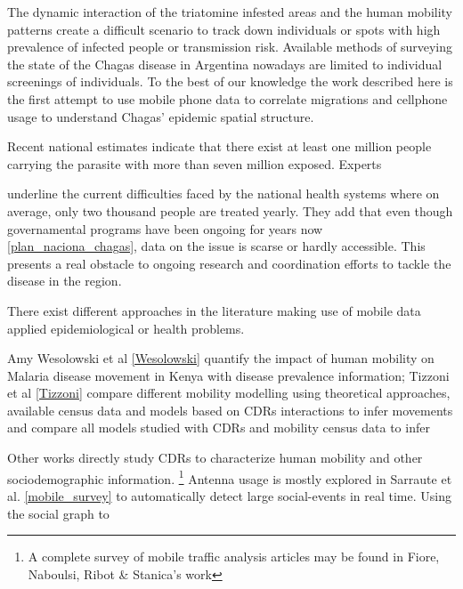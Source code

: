 The dynamic interaction of the triatomine infested areas and the human mobility patterns create a difficult scenario to track down individuals or spots with high prevalence of infected people or transmission risk. Available methods of surveying the state of the Chagas disease in Argentina nowadays are limited to individual screenings of individuals. To the best of our knowledge the work described here is the first attempt to use mobile phone data to correlate migrations and cellphone usage to understand Chagas’ epidemic spatial structure.

Recent national estimates indicate that there exist at least one million people carrying the parasite with more than seven million exposed. Experts \begin{comment}  aca como referencio a Diego Weinberg y Mundo Sano? \end{comment} underline the current difficulties faced by the national health systems where on average, only two thousand people are treated yearly. They add that even though governamental programs have been ongoing for years now \ref{plan_naciona_chagas}, data on the issue is scarse or hardly accessible. This presents a real obstacle to ongoing research and coordination efforts to tackle the disease in the region.

There exist different approaches in the literature making use of mobile data applied epidemiological or health problems.\begin{comment} La siguiente info la saco de aqui  https://docs.google.com/document/d/1ZClgYFTLCxmg7wvRXqz2V1EP7Wcg0vd2ZwEBOLW2VOk \end{comment} Amy Wesolowski et al \ref{Wesolowski}  quantify the impact of human mobility on Malaria disease movement in Kenya with disease prevalence information; Tizzoni et al \ref{Tizzoni} compare different mobility modelling using theoretical approaches, available census data and models based on CDRs interactions to infer movements and compare all models studied with CDRs and mobility census data to infer

Other works directly study CDRs to characterize human mobility and other sociodemographic information. \footnote{A complete survey of mobile traffic analysis articles may be found in Fiore, Naboulsi, Ribot & Stanica's work} Antenna usage is mostly explored in Sarraute et al. \ref{mobile_survey} to automatically detect large social-events in real time. Using the social graph to 
